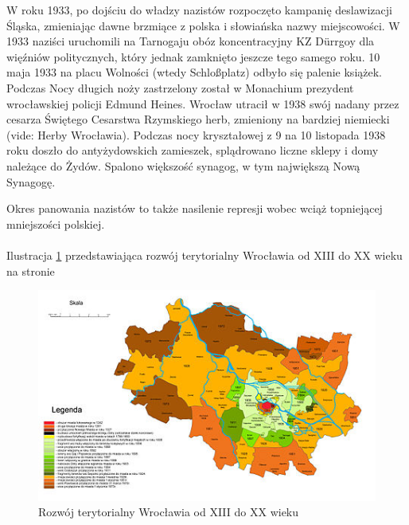 \documentclass{article}
\begin{document}
W roku 1933, po dojściu do władzy nazistów rozpoczęto kampanię deslawizacji Śląska, zmieniając dawne brzmiące z polska i słowiańska nazwy miejscowości. W 1933 naziści uruchomili na Tarnogaju obóz koncentracyjny KZ Dürrgoy dla więźniów politycznych, który jednak zamknięto jeszcze tego samego roku. 10 maja 1933 na placu Wolności (wtedy Schloßplatz) odbyło się palenie książek. Podczas Nocy długich noży zastrzelony został w Monachium prezydent wrocławskiej policji Edmund Heines. Wrocław utracił w 1938 swój nadany przez cesarza Świętego Cesarstwa Rzymskiego herb, zmieniony na bardziej niemiecki (vide: Herby Wrocławia). Podczas nocy kryształowej z 9 na 10 listopada 1938 roku doszło do antyżydowskich zamieszek, splądrowano liczne sklepy i domy należące do Żydów. Spalono większość synagog, w tym największą Nową Synagogę.

Okres panowania nazistów to także nasilenie represji wobec wciąż topniejącej mniejszości polskiej.\\
\\
Ilustracja \ref{fig:rozwojter} przedstawiająca rozwój terytorialny Wrocławia od XIII do XX wieku na stronie \pageref{fig:rozwojter}
\begin{figure}[h!]
\centering
\includegraphics[scale=2]{450px-Rozwój_terytorialny_Wrocławia.jpg}
\caption{Rozwój terytorialny Wrocławia od XIII do XX wieku}
\label{fig:rozwojter}
\end{figure}
\end{document}
